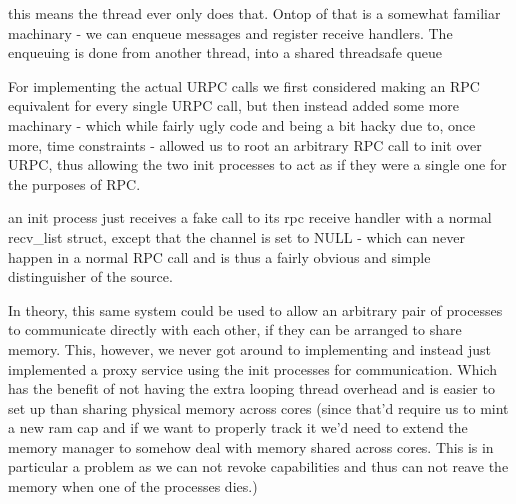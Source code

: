 this means the thread ever only does that. Ontop of that is a somewhat familiar machinary - we can enqueue messages and register receive handlers. The enqueuing is done from another thread, into a shared threadsafe queue

For implementing the actual URPC calls we first considered making an RPC equivalent for every single URPC call, but then instead added some more machinary - which while fairly ugly code and being a bit hacky due to, once more, time constraints - allowed us to root an arbitrary RPC call to init over URPC, thus allowing the two init processes to act as if they were a single one for the purposes of RPC.

an init process just receives a fake call to its rpc receive handler with a normal recv\_list struct, except that the channel is set to NULL - which can never happen in a normal RPC call and is thus a fairly obvious and simple distinguisher of the source.

In theory, this same system could be used to allow an arbitrary pair of processes to communicate directly with each other, if they can be arranged to share memory. This, however, we never got around to implementing and instead just implemented a proxy service using the init processes for communication. Which has the benefit of not having the extra looping thread overhead and is easier to set up than sharing physical memory across cores (since that'd require us to mint a new ram cap and if we want to properly track it we'd need to extend the memory manager to somehow deal with memory shared across cores. This is in particular a problem as we can not revoke capabilities and thus can not reave the memory when one of the processes dies.)